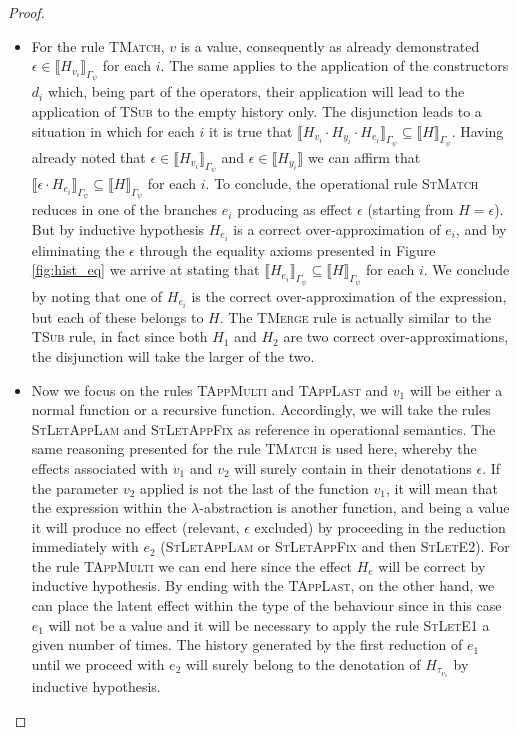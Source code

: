 \begin{proof}
\begin{itemize}
        \item For the rule \textsc{TMatch}, $v$ is a value, consequently as already demonstrated $\epsilon \in \llbracket H_{v_i} \rrbracket_{\Gamma_{\psi}}$ for each $i$. The same applies to the application of the constructors $d_i$ which, being part of the operators, their application will lead to the application of \textsc{TSub} to the empty history only. The disjunction leads to a situation in which for each $i$ it is true that $\llbracket H_{v_i} \cdot H_{y_i} \cdot H_{e_i} \rrbracket_{\Gamma_{\psi}} \subseteq \llbracket H \rrbracket_{\Gamma_{\psi}}$. Having already noted that $\epsilon \in \llbracket H_{v_i} \rrbracket_{\Gamma_{\psi}}$ and $\epsilon \in \llbracket H_{y_i} \rrbracket$ we can affirm that $\llbracket \epsilon \cdot H_{e_i} \rrbracket_{\Gamma_{\psi}} \subseteq \llbracket H \rrbracket_{\Gamma_{\psi}}$ for each $i$. To conclude, the operational rule \textsc{StMatch} reduces in one of the branches $e_i$ producing as effect $\epsilon$ (starting from $H = \epsilon$). But by inductive hypothesis $H_{e_i}$ is a correct over-approximation of $e_i$, and by eliminating the $\epsilon$ through the equality axioms presented in Figure \ref{fig:hist_eq} we arrive at stating that $\llbracket H_{e_i} \rrbracket_{\Gamma_{\psi}} \subseteq \llbracket H \rrbracket_{\Gamma_{\psi}}$ for each $i$. We conclude by noting that one of $H_{e_i}$ is the correct over-approximation of the expression, but each of these belongs to $H$. The \textsc{TMerge} rule is actually similar to the \textsc{TSub} rule, in fact since both $H_1$ and $H_2$ are two correct over-approximations, the disjunction will take the larger of the two.
        \item Now we focus on the rules \textsc{TAppMulti} and \textsc{TAppLast} and $v_1$ will be either a normal function or a recursive function. Accordingly, we will take the rules \textsc{StLetAppLam} and \textsc{StLetAppFix} as reference in operational semantics. The same reasoning presented for the rule \textsc{TMatch} is used here, whereby the effects associated with $v_1$ and $v_2$ will surely contain in their denotations $\epsilon$. If the parameter $v_2$ applied is not the last of the function $v_1$, it will mean that the expression within the $\lambda$-abstraction is another function, and being a value it will produce no effect (relevant, $\epsilon$ excluded) by proceeding in the reduction immediately with $e_2$ (\textsc{StLetAppLam} or \textsc{StLetAppFix} and then \textsc{StLetE2}). For the rule \textsc{TAppMulti} we can end here since the effect $H_e$ will be correct by inductive hypothesis. By ending with the \textsc{TAppLast}, on the other hand, we can place the latent effect within the type of the behaviour since in this case $e_1$ will not be a value and it will be necessary to apply the rule \textsc{StLetE1} a given number of times. The history generated by the first reduction of $e_1$ until we proceed with $e_2$ will surely belong to the denotation of $H_{\tau_{v_1}}$ by inductive hypothesis.

\end{itemize}
\end{proof}
